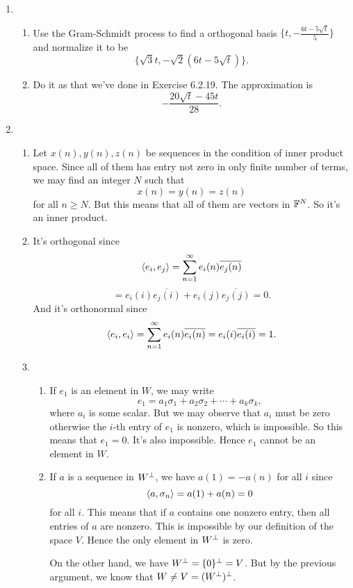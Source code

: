 \begin{enumerate}
\item \begin{enumerate}
\item Use the Gram-Schmidt process to find a orthogonal basis $\{t,-\frac{6t-5\sqrt{t}}{5}\}$ and normalize it to be 
\[\{\sqrt{3}t,-\sqrt{2}(6t-5\sqrt{t})\}.\]
\item Do it as that we've done in Exercise 6.2.19. The approximation is 
\[-\frac{20\sqrt{t}-45t}{28}.\]
\end{enumerate}
\item \begin{enumerate}
\item Let $x(n),y(n),z(n)$ be sequences in the condition of inner product space. Since all of them has entry not zero in only finite number of terms, we may find an integer $N$ such that 
\[x(n)=y(n)=z(n)\]
for all $n\geq N$. But this means that all of them are vectors in $\mathbb{F}^N$. So it's an inner product.
\item It's orthogonal since 
\[\langle e_i,e_j\rangle =\sum_{n=1}^{\infty}{e_i(n)\overline{e_j(n)}}\]
\[=e_i(i)\overline{e_j(i)}+e_i(j)\overline{e_j(j)}=0.\]
And it's orthonormal since 
\[\langle e_i,e_i\rangle =\sum_{n=1}^{\infty}{e_i(n)\overline{e_i(n)}}=e_i(i)\overline{e_i(i)}=1.\]
\item \begin{enumerate}
\item If $e_1$ is an element in $W$, we may write 
\[e_1=a_1\sigma_1+a_2\sigma_2+\cdots +a_k\sigma_k,\]
where $a_i$ is some scalar. But we may observe that $a_i$ must be zero otherwise the $i$-th entry of $e_1$ is nonzero, which is impossible. So this means that $e_1=0$. It's also impossible. Hence $e_1$ cannot be an element in $W$.
\item If $a$ is a sequence in $W^{\perp}$, we have $a(1)=-a(n)$ for all $i$ since 
\[\langle a,\sigma_n\rangle =a(1)+a(n)=0\]
for all $i$. This means that if $a$ contains one nonzero entry, then all entries of $a$ are nonzero. This is impossible by our definition of the space $V$. Hence the only element in $W^{\perp}$ is zero.

On the other hand, we have $W^{\perp} =\{0\}^{\perp} =V$. But by the previous argument, we know that $W\neq V=(W^{\perp})^{\perp}$.
\end{enumerate}
\end{enumerate}
\end{enumerate}

